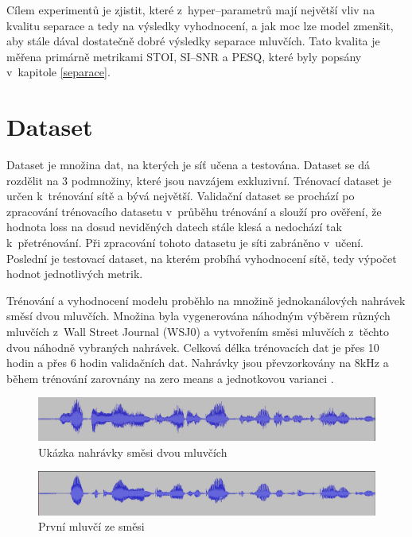 Cílem experimentů je zjistit, které z~hyper--parametrů mají největší vliv na kvalitu separace a tedy na výsledky vyhodnocení, a jak moc lze model zmenšit, aby stále dával dostatečně dobré výsledky separace mluvčích. Tato kvalita je měřena primárně metrikami STOI, SI--SNR a PESQ, které byly popsány v~kapitole \ref{separace}.


\section{Dataset}
Dataset je množina dat, na kterých je síť učena a testována. Dataset se dá rozdělit na 3 podmnožiny, které jsou navzájem exkluzivní. Trénovací dataset je určen k~trénování sítě a bývá největší. Validační dataset se prochází po zpracování trénovacího datasetu v~průběhu trénování a slouží pro ověření, že hodnota loss na dosud neviděných datech stále klesá a nedochází tak k~přetrénování. Při zpracování tohoto datasetu je síti zabráněno v~učení. Poslední je testovací dataset, na kterém probíhá vyhodnocení sítě, tedy výpočet hodnot jednotlivých metrik. 

Trénování a vyhodnocení modelu proběhlo na množině jednokanálových nahrávek směsí dvou mluvčích. Množina byla vygenerována náhodným výběrem různých mluvčích z~Wall Street Journal (WSJ0) a vytvořením směsi mluvčích z~těchto dvou náhodně vybraných nahrávek. Celková délka trénovacích dat je přes 10 hodin a přes 6 hodin validačních dat. Nahrávky jsou převzorkovány na 8kHz a během trénování zarovnány na zero means a jednotkovou varianci .

\begin{figure}[H]
    \centering
    \includegraphics[scale=0.35]{obrazky-figures/dataset-mix.png}
    \caption{\label{fig:ref-mixture}Ukázka nahrávky směsi dvou mluvčích}
\end{figure}

\begin{figure}[H]
    \centering
    \includegraphics[scale=0.35]{obrazky-figures/dataset-s1.png}
    \caption{\label{fig:ref-s1}První mluvčí ze směsi}
\end{figure}

